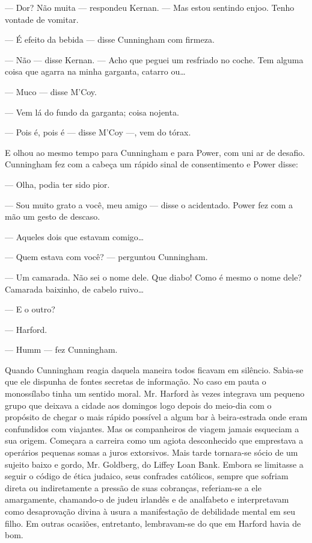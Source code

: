 --- Dor? Não muita --- respondeu Kernan. --- Mas estou sentindo
enjoo. Tenho vontade de vomitar.

--- É efeito da bebida --- disse Cunningham com firmeza.

--- Não --- disse Kernan. --- Acho que peguei um resfriado no coche.
Tem alguma coisa que agarra na minha garganta, catarro ou\ldots{}

--- Muco --- disse M'Coy.

--- Vem lá do fundo da garganta; coisa nojenta.

--- Pois é, pois é --- disse M'Coy ---, vem do tórax.

E olhou ao mesmo tempo para Cunningham e para Power, com uni ar de
desafio. Cunningham fez com a cabeça um rápido sinal de consentimento
e Power disse:

--- Olha, podia ter sido pior.

--- Sou muito grato a você, meu amigo --- disse o acidentado. Power
fez com a mão um gesto de descaso.

--- Aqueles dois que estavam comigo\ldots{}

--- Quem estava com você? --- perguntou Cunningham.

--- Um camarada. Não sei o nome dele. Que diabo! Como é mesmo o nome
dele? Camarada baixinho, de cabelo ruivo\ldots{}

--- E o outro?

--- Harford.

--- Humm --- fez Cunningham.

Quando Cunningham reagia daquela maneira todos ficavam em silêncio.
Sabia-se que ele dispunha de fontes secretas de informação. No caso
em pauta o monossílabo tinha um sentido moral. Mr. Harford às vezes
integrava um pequeno grupo que deixava a cidade aos domingos logo
depois do meio-dia com o propósito de chegar o mais rápido possível a
algum bar à beira-estrada onde eram confundidos com viajantes. Mas os
companheiros de
viagem jamais esqueciam a sua origem. Começara a carreira como um agiota
desconhecido que emprestava a operários pequenas somas a juros
extorsivos. Mais tarde tornara-se sócio de um sujeito baixo e gordo,
Mr. Goldberg, do Liffey Loan Bank. Embora se limitasse a seguir o
código de ética judaico, seus confrades católicos, sempre que
sofriam direta ou indiretamente a pressão de suas cobranças,
referiam-se a ele amargamente, chamando-o de judeu irlandês e de
analfabeto e interpretavam como desaprovação divina à usura a
manifestação de debilidade mental em seu filho. Em outras ocasiões,
entretanto, lembravam-se do que em Harford havia de bom.

